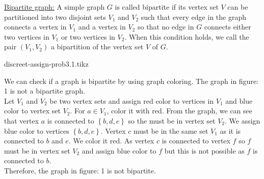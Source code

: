 \documentclass[12pt,class=article,crop=false]{standalone}
\begin{document}
\begin{soln}
    \underline{Bipartite graph:} A simple graph $ G $ is called bipartite if its vertex set $ V $ can be partitioned into two disjoint sets $ V_1 $ and $ V_2 $ such that every edge in the graph connects a vertex in $ V_1 $ and a vertex in $ V_2 $ so that no edge in $ G $ connects either two vertices in $ V_1 $ or two vertices in $ V_2 $. When this condition holds, we call the pair $ (V_1,V_2) $ a bipartition of the vertex set $ V $ of $ G $.\\

    \begin{center}
        {discreet-assign-prob3.1.tikz}
    \end{center}
    We can check if a graph is bipartite by using graph coloring. The graph in figure: 1 is not a bipartite graph.\\

    Let $ V_1 $ and $ V_2 $ be two vertex sets and assign red color to vertices in $ V_1 $ and blue color to vertex set $ V_2 $. For $ a\in V_1 $, color it with red. From the graph, we can see that vertex $ a $ is connected to $ \left\{ b,d,e \right\}  $ so the must be in vertex set $ V_2 $. We assign blue color to vertices $ \left\{ b,d,e \right\}  $. Vertex $ c $ must be in the same set $ V_1 $ as it is connected to $ b $ and $ e $. We color it red. As vertex $ c $ is connected to vertex $ f $ so $ f $ must be in vertex set $ V_2 $ and assign blue color to $ f $ but this is not possible as $ f $ is connected to $ b $.\\
    
    
    Therefore, the graph in figure: 1 is not bipartite.
\end{soln}
\end{document}
